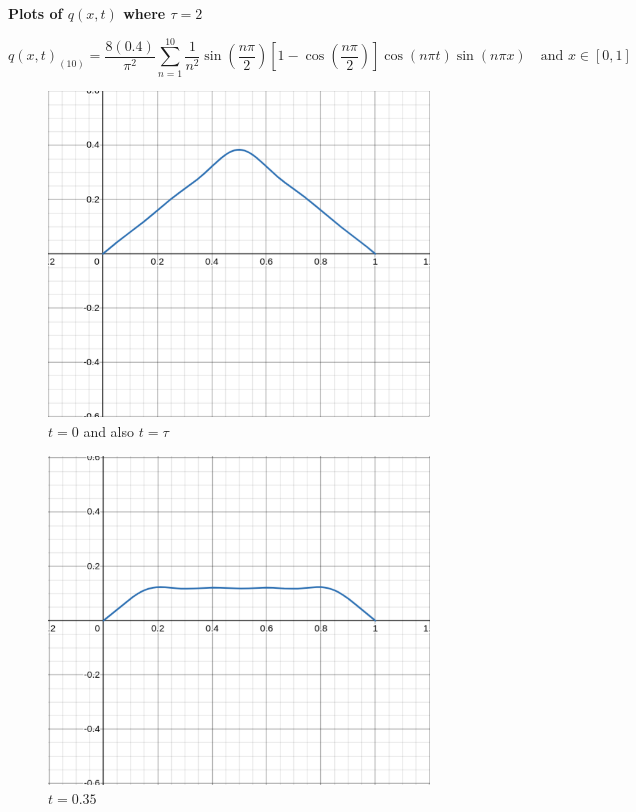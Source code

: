 \documentclass[letter]{article}
\begin{document}
\newpage

\begin{center}
	{\huge \textbf{Plots of $q(x,t)$ where $\tau = 2$ }}
\end{center}
\[
\boxed{
q(x,t)_{(10)} = \frac{8 (0.4)}{\pi ^2 } 
\sum_{n=1}^{10} \frac{1}{n^2} \sin \left(\frac{n \pi }{2}\right) 
\left[ 
1 - \cos \left(\frac{n \pi }{2}\right)
\right] \cos \left( n \pi t\right) \sin (n \pi x) 
\quad \text{and } x \in [0,1]
}\]
\begin{minipage}{0.5\textwidth}
\begin{figure}[H]
	\centering
	\includegraphics[width=0.9\textwidth]{ss/c_n_001.png}
	\caption{$t = 0$ and also $t = \tau$}
	\label{fig:ss-c_n_001-png}
\end{figure}
\begin{figure}[H]
	\centering
	\includegraphics[width=0.9\textwidth]{ss/c_n_025.png}
	\caption{$t = 0.35$}
	\label{fig:ss-c_n_01-png}
\end{figure}
\end{minipage}
\end{document}
